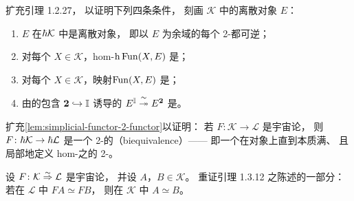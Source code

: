 \begin{exercise}\label{ex:discrete-objects-characterize}
扩充引理 1.2.27，%
以证明下列四条条件\trEquivalence{}，
刻画\trInfinityCosmos{} $\mathcal{K}$ 中的离散对象 $E$：
\begin{enumerate}[label=(\roman*)]
\item $E$ 在\trHomotopyTwoCategory $\hbar \mathcal{K}$ 中是离散对象，
  即以 $E$ 为余域的每个 2-\trCell{}都可逆；
\item 对每个 $X\in\mathcal{K}$，hom-\trCategory $\mathrm{h}\operatorname{Fun}(X,E)$ 是\trGroupoid{}；
\item 对每个 $X\in\mathcal{K}$，映射\trQuasiCategory $\operatorname{Fun}(X,E)$ 是\trKanComplex{}；
\item 由\trSimplicialSet{}的包含 $\mathbf{2}\hookrightarrow\mathbb{I}$ 诱导的\trIsofibration
  $E^{\mathbb{I}}\mathrel{\stackrel{\sim}{\twoheadrightarrow}} E^{\mathbf{2}}$ 是\trTrivialFibration{}。
\end{enumerate}
\end{exercise}

\begin{exercise}[命题 10.3.1]\label{ex:biequivalence-homotopy-2cat}
扩充\cref{lem:simplicial-functor-2-functor}以证明：
若 $F\colon\mathcal{K}\to\mathcal{L}$ 是宇宙论\trBiequivalence{}，
则 $F\colon\hbar \mathcal{K}\to\hbar \mathcal{L}$
是一个 2-\trCategory{}的\textbf{\trBiequivalence}（biequivalence）——
即一个在对象上直到\trEquivalence{}本质满、
且局部地定义 hom-\trCategory{}之\trEquivalence{}的 2-\trFunctor{}。
\end{exercise}

\begin{exercise}\label{ex:creation-of-equivalences}
设 $F\colon\mathcal{K}\mathrel{\stackrel{\sim}{\Rightarrow}}\mathcal{L}$ 是宇宙论\trBiequivalence{}，
并设 $A$，$B\in\mathcal{K}$。
重证引理 1.3.12 之陈述的一部分：若在 $\mathcal{L}$ 中 $FA\simeq FB$，
则在 $\mathcal{K}$ 中 $A\simeq B$。
\end{exercise}

